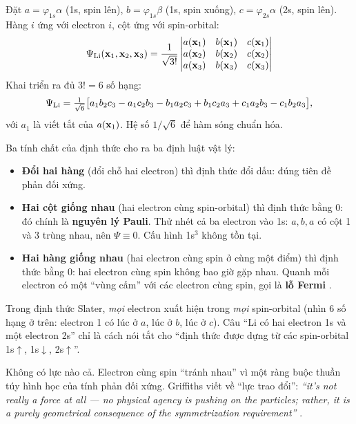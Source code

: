 \begin{congthuc}
Đặt $a=\varphi_{1s}\alpha$ (1s, spin lên), $b=\varphi_{1s}\beta$ (1s, spin xuống), $c=\varphi_{2s}\alpha$ (2s, spin lên). Hàng $i$ ứng với electron $i$, cột ứng với spin-orbital:
\[
\Psi_{\rm Li}(\mathbf x_1,\mathbf x_2,\mathbf x_3)=\frac{1}{\sqrt{3!}}
\begin{vmatrix}
a(\mathbf x_1) & b(\mathbf x_1) & c(\mathbf x_1)\\
a(\mathbf x_2) & b(\mathbf x_2) & c(\mathbf x_2)\\
a(\mathbf x_3) & b(\mathbf x_3) & c(\mathbf x_3)
\end{vmatrix}
\]
Khai triển ra đủ $3!=6$ số hạng:
\[
\Psi_{\rm Li}=\tfrac{1}{\sqrt6}\big[a_1b_2c_3-a_1c_2b_3-b_1a_2c_3+b_1c_2a_3+c_1a_2b_3-c_1b_2a_3\big],
\]
với $a_1$ là viết tắt của $a(\mathbf x_1)$. Hệ số $1/\sqrt{6}$ để hàm sóng chuẩn hóa.

Ba tính chất của định thức cho ra ba định luật vật lý:
\begin{itemize}
\item \textbf{Đổi hai hàng} (đổi chỗ hai electron) thì định thức đổi dấu: đúng tiên đề phản đối xứng.
\item \textbf{Hai cột giống nhau} (hai electron cùng spin-orbital) thì định thức bằng 0: đó chính là \textbf{nguyên lý Pauli}. Thử nhét cả ba electron vào 1s: $a, b, a$ có cột 1 và 3 trùng nhau, nên $\Psi\equiv0$. Cấu hình 1s$^3$ không tồn tại.
\item \textbf{Hai hàng giống nhau} (hai electron cùng spin ở cùng một điểm) thì định thức bằng 0: hai electron cùng spin không bao giờ gặp nhau. Quanh mỗi electron có một ``vùng cấm'' với các electron cùng spin, gọi là \textbf{lỗ Fermi} .
\end{itemize}
\end{congthuc}

\begin{hieulam}
Trong định thức Slater, \emph{mọi} electron xuất hiện trong \emph{mọi} spin-orbital (nhìn 6 số hạng ở trên: electron 1 có lúc ở $a$, lúc ở $b$, lúc ở $c$). Câu ``Li có hai electron 1s và một electron 2s'' chỉ là cách nói tắt cho ``định thức được dựng từ các spin-orbital 1s$\uparrow$, 1s$\downarrow$, 2s$\uparrow$''.
\end{hieulam}

\begin{hieulam}
Không có lực nào cả. Electron cùng spin ``tránh nhau'' vì một ràng buộc thuần túy hình học của tính phản đối xứng. Griffiths viết về ``lực trao đổi'': \emph{``it's not really a force at all --- no physical agency is pushing on the particles; rather, it is a purely geometrical consequence of the symmetrization requirement''} \cite{Griffiths2018}.
\end{hieulam}

